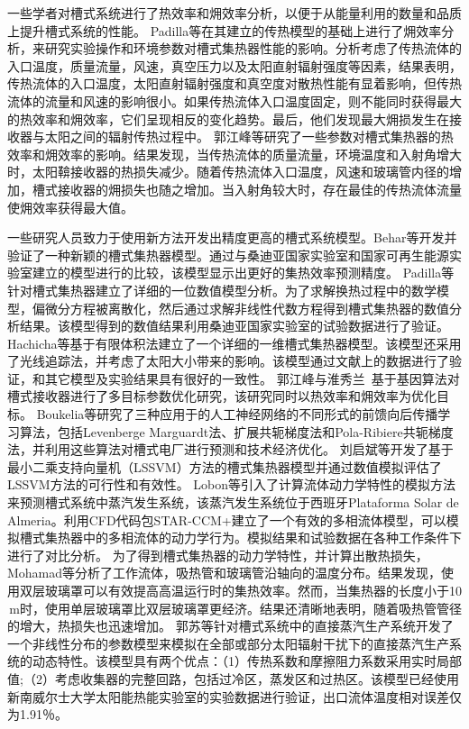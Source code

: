 一些学者对槽式系统进行了热效率和㶲效率分析，以便于从能量利用的数量和品质上提升槽式系统的性能。
Padilla等\cite{Padilla2014}在其建立的传热模型\cite{Padilla2011}的基础上进行了㶲效率分析，来研究实验操作和环境参数对槽式集热器性能的影响。分析考虑了传热流体的入口温度，质量流量，风速，真空压力以及太阳直射辐射强度等因素，结果表明，传热流体的入口温度，太阳直射辐射强度和真空度对散热性能有显着影响，但传热流体的流量和风速的影响很小。如果传热流体入口温度固定，则不能同时获得最大的热效率和㶲效率，它们呈现相反的变化趋势。最后，他们发现最大㶲损发生在接收器与太阳之间的辐射传热过程中。
郭江峰等\cite{JiangfengGuo2016-1}研究了一些参数对槽式集热器的热效率和㶲效率的影响。结果发现，当传热流体的质量流量，环境温度和入射角增大时，太阳鞥接收器的热损失减少。随着传热流体入口温度，风速和玻璃管内径的增加，槽式接收器的㶲损失也随之增加。当入射角较大时，存在最佳的传热流体流量使㶲效率获得最大值。

一些研究人员致力于使用新方法开发出精度更高的槽式系统模型。Behar等\cite{Behar2015}开发并验证了一种新颖的槽式集热器模型。通过与桑迪亚国家实验室和国家可再生能源实验室建立的模型进行的比较，该模型显示出更好的集热效率预测精度。
Padilla等\cite{Padilla2011}针对槽式集热器建立了详细的一位数值模型分析。为了求解换热过程中的数学模型，偏微分方程被离散化，然后通过求解非线性代数方程得到槽式集热器的数值分析结果。该模型得到的数值结果利用桑迪亚国家实验室的试验数据进行了验证。
Hachicha等\cite{Hachicha2013}基于有限体积法建立了一个详细的一维槽式集热器模型。该模型还采用了光线追踪法，并考虑了太阳大小带来的影响。该模型通过文献上的数据进行了验证，和其它模型及实验结果具有很好的一致性。
郭江峰与淮秀兰~\cite{JiangfengGuo2016-2}基于基因算法对槽式接收器进行了多目标参数优化研究，该研究同时以热效率和㶲效率为优化目标。
Boukelia等\cite{Boukelia2016}研究了三种应用于的人工神经网络的不同形式的前馈向后传播学习算法，包括Levenberge Marguardt法、扩展共轭梯度法和Pola-Ribiere共轭梯度法，并利用这些算法对槽式电厂进行预测和技术经济优化。
刘启斌等\cite{Liu2012}开发了基于最小二乘支持向量机（LSSVM）方法的槽式集热器模型并通过数值模拟评估了LSSVM方法的可行性和有效性。
Lobon等\cite{Lobon2014}引入了计算流体动力学特性的模拟方法来预测槽式系统中蒸汽发生系统，该蒸汽发生系统位于西班牙Plataforma Solar de Almeria。利用CFD代码包STAR-CCM+建立了一个有效的多相流体模型，可以模拟槽式集热器中的多相流体的动力学行为。模拟结果和试验数据在各种工作条件下进行了对比分析。
为了得到槽式集热器的动力学特性，并计算出散热损失，Mohamad等\cite{Mohamad2014}分析了工作流体，吸热管和玻璃管沿轴向的温度分布。结果发现，使用双层玻璃罩可以有效提高高温运行时的集热效率。然而，当集热器的长度小于10$\,\mathrm{m}$时，使用单层玻璃罩比双层玻璃罩更经济。结果还清晰地表明，随着吸热管管径的增大，热损失也迅速增加。
郭苏等\cite{SuGuo2016}针对槽式系统中的直接蒸汽生产系统开发了一个非线性分布的参数模型来模拟在全部或部分太阳辐射干扰下的直接蒸汽生产系统的动态特性。该模型具有两个优点：（1）传热系数和摩擦阻力系数采用实时局部值;（2）考虑收集器的完整回路，包括过冷区，蒸发区和过热区。该模型已经使用新南威尔士大学太阳能热能实验室的实验数据进行验证，出口流体温度相对误差仅为1.91％。

